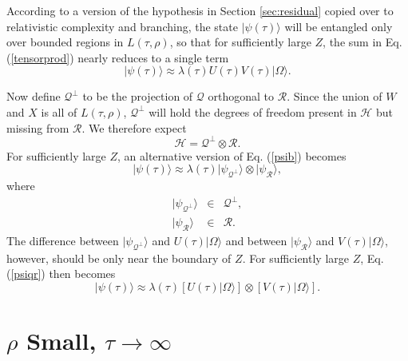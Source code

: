 \documentclass[twocolumn,amsmath,amssymb]{revtex4-1}
\begin{document}
According to a version of the hypothesis in Section \ref{sec:residual}
copied over to relativistic complexity and branching, the state
$|\psi( \tau) \rangle $ will be entangled
only over bounded regions in $L( \tau, \rho)$,
so that for sufficiently large $Z$, 
the sum in Eq. (\ref{tensorprod}) nearly reduces to a single term
\begin{equation}
  \label{psib0}
  |\psi(\tau) \rangle   \approx \lambda( \tau) U(\tau) V(\tau) |\Omega \rangle .
\end{equation}

Now define $\mathcal{Q}^\perp$ to be the projection of $\mathcal{Q}$ orthogonal
to $\mathcal{R}$. Since the union of $W$ and $X$ is all of $L( \tau, \rho)$,
$\mathcal{Q}^\perp$ will hold
the degrees of freedom present in $\mathcal{H}$ but missing from $\mathcal{R}$.
We therefore expect
\begin{equation}
  \label{hqr}
  \mathcal{H} = \mathcal{Q}^\perp \otimes \mathcal{R}.
\end{equation}
For sufficiently large $Z$, an alternative version of Eq. (\ref{psib})
becomes
\begin{equation}
  \label{psiqr}
  |\psi(\tau) \rangle  \approx \lambda( \tau) |\psi_{\mathcal{Q}^\perp} \rangle  \otimes |\psi_{\mathcal{R}} \rangle ,
\end{equation}
where
\begin{subequations}
  \begin{eqnarray}
    \label{psiqperp}
      |\psi_{\mathcal{Q}^\perp} \rangle  &\in& \mathcal{Q}^\perp, \\
    \label{psir}
    |\psi_{\mathcal{R}} \rangle  &\in& \mathcal{R}.
  \end{eqnarray}
\end{subequations}
The difference between $|\psi_{\mathcal{Q}^\perp} \rangle $ and $U(\tau) |\Omega \rangle $
and between $|\psi_{\mathcal{R}} \rangle $ and $V(\tau) |\Omega \rangle $, however,
should be only near the boundary of $Z$.
For sufficiently large $Z$, Eq. (\ref{psiqr}) then becomes
\begin{equation}
  \label{psib}
  |\psi(\tau) \rangle  \approx \lambda( \tau) [U(\tau) |\Omega \rangle ] \otimes [V(\tau) |\Omega \rangle ].
\end{equation}




\section{\label{sec:rhozero}$\rho$ Small, $\tau \rightarrow \infty$}
\end{document}
